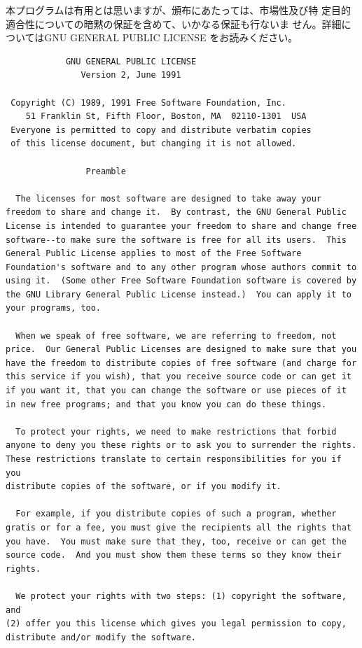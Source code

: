 \documentclass[mingoth,a4paper]{jsarticle}
\begin{document}
本プログラムは有用とは思いますが、頒布にあたっては、市場性及び特
定目的適合性についての暗黙の保証を含めて、いかなる保証も行ないま
せん。詳細についてはGNU GENERAL PUBLIC LICENSE をお読みください。

\begin{multicols}{2}
 \begin{fontsize}{6}{6}
 \begin{verbatim}
            GNU GENERAL PUBLIC LICENSE
               Version 2, June 1991

 Copyright (C) 1989, 1991 Free Software Foundation, Inc.
    51 Franklin St, Fifth Floor, Boston, MA  02110-1301  USA
 Everyone is permitted to copy and distribute verbatim copies
 of this license document, but changing it is not allowed.

                Preamble

  The licenses for most software are designed to take away your
freedom to share and change it.  By contrast, the GNU General Public
License is intended to guarantee your freedom to share and change free
software--to make sure the software is free for all its users.  This
General Public License applies to most of the Free Software
Foundation's software and to any other program whose authors commit to
using it.  (Some other Free Software Foundation software is covered by
the GNU Library General Public License instead.)  You can apply it to
your programs, too.

  When we speak of free software, we are referring to freedom, not
price.  Our General Public Licenses are designed to make sure that you
have the freedom to distribute copies of free software (and charge for
this service if you wish), that you receive source code or can get it
if you want it, that you can change the software or use pieces of it
in new free programs; and that you know you can do these things.

  To protect your rights, we need to make restrictions that forbid
anyone to deny you these rights or to ask you to surrender the rights.
These restrictions translate to certain responsibilities for you if you
distribute copies of the software, or if you modify it.

  For example, if you distribute copies of such a program, whether
gratis or for a fee, you must give the recipients all the rights that
you have.  You must make sure that they, too, receive or can get the
source code.  And you must show them these terms so they know their
rights.

  We protect your rights with two steps: (1) copyright the software, and
(2) offer you this license which gives you legal permission to copy,
distribute and/or modify the software.


\end{verbatim}
\end{fontsize}
\end{multicols}
\end{document}
